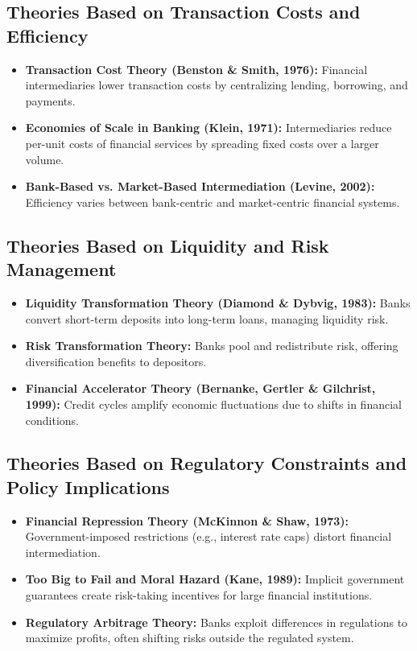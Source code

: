 \subsection{Theories Based on Transaction Costs and Efficiency}
\begin{itemize}
    \item \textbf{Transaction Cost Theory (Benston \& Smith, 1976):} Financial intermediaries lower transaction costs by centralizing lending, borrowing, and payments.
    \item \textbf{Economies of Scale in Banking (Klein, 1971):} Intermediaries reduce per-unit costs of financial services by spreading fixed costs over a larger volume.
    \item \textbf{Bank-Based vs. Market-Based Intermediation (Levine, 2002):} Efficiency varies between bank-centric and market-centric financial systems.
\end{itemize}

\subsection{Theories Based on Liquidity and Risk Management}
\begin{itemize}
    \item \textbf{Liquidity Transformation Theory (Diamond \& Dybvig, 1983):} Banks convert short-term deposits into long-term loans, managing liquidity risk.
    \item \textbf{Risk Transformation Theory:} Banks pool and redistribute risk, offering diversification benefits to depositors.
    \item \textbf{Financial Accelerator Theory (Bernanke, Gertler \& Gilchrist, 1999):} Credit cycles amplify economic fluctuations due to shifts in financial conditions.
\end{itemize}

\subsection{Theories Based on Regulatory Constraints and Policy Implications}
\begin{itemize}
    \item \textbf{Financial Repression Theory (McKinnon \& Shaw, 1973):} Government-imposed restrictions (e.g., interest rate caps) distort financial intermediation.
    \item \textbf{Too Big to Fail and Moral Hazard (Kane, 1989):} Implicit government guarantees create risk-taking incentives for large financial institutions.
    \item \textbf{Regulatory Arbitrage Theory:} Banks exploit differences in regulations to maximize profits, often shifting risks outside the regulated system.
\end{itemize}

